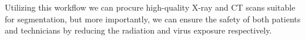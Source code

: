 Utilizing this workflow we can procure high-quality X-ray and CT scans suitable for segmentation, but more importantly, we can ensure the safety of both patients and technicians by reducing the radiation and virus exposure respectively. 

